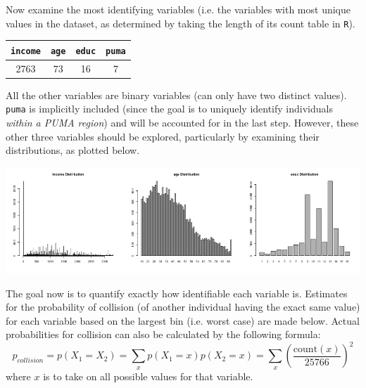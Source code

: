 \documentclass[12pt]{article}
\begin{document}

Now examine the most identifying variables (i.e. the variables with most unique values in the dataset, as determined by taking the length of its count table in \texttt{R}).
\begin{center}
\begin{tabular}{||c|c|c|c||}
\hline
\texttt{income} & \texttt{age} & \texttt{educ} & \texttt{puma} \\\hline
2763 & 73 & 16 & 7 \\ \hline
\end{tabular}
\end{center}
All the other variables are binary variables (can only have two distinct values). \texttt{puma} is implicitly included (since the goal is to uniquely identify individuals \emph{within a PUMA region}) and will be accounted for in the last step. However, these other three variables should be explored, particularly by examining their distributions, as plotted below.

\begin{center}
\includegraphics[width=\textwidth]{figs/exploredist}
\end{center}

The goal now is to quantify exactly how identifiable each variable is. Estimates for the probability of collision (of another individual having the exact same value) for each variable based on the largest bin (i.e. worst case) are made below. Actual probabilities for collision can also be calculated by the following formula:
\[p_{collision}=p(X_1 = X_2) = \sum\limits_{x} p(X_1 = x)p(X_2=x) = \sum\limits_x \left(\dfrac{\text{count}(x)}{25766}\right)^2\]
where $x$ is to take on all possible values for that variable.
\end{document}
